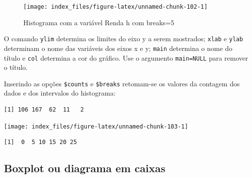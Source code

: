 \documentclass[12pt,brazil,oneside]{book}
\newenvironment{Shaded}{\begin{snugshade}}{\end{snugshade}}
\newcommand{\DataTypeTok}[1]{\textcolor[rgb]{0.13,0.29,0.53}{#1}}
\newcommand{\DecValTok}[1]{\textcolor[rgb]{0.00,0.00,0.81}{#1}}
\newcommand{\KeywordTok}[1]{\textcolor[rgb]{0.13,0.29,0.53}{\textbf{#1}}}
\newcommand{\NormalTok}[1]{#1}
\newcommand{\OperatorTok}[1]{\textcolor[rgb]{0.81,0.36,0.00}{\textbf{#1}}}
\newcommand{\StringTok}[1]{\textcolor[rgb]{0.31,0.60,0.02}{#1}}
\begin{document}
\begin{figure}[H]

{\centering \texttt{[image: index\_files/figure-latex/unnamed-chunk-102-1]} 

}

\caption{Histograma com a variável Renda h com breaks=5}\label{fig:unnamed-chunk-102}
\end{figure}

O comando \texttt{ylim} determina os limites do eixo y a serem mostrados; \texttt{xlab} e \texttt{ylab} determinam o nome das variáveis dos eixos x e y; \texttt{main} determina o nome do título e \texttt{col} determina a cor do gráfico. Use o argumento \texttt{main=NULL} para remover o título.

Inserindo as opções \texttt{\$counts} e \texttt{\$breaks} retomam-se os valores da contagem dos dados e dos intervalos do histograma:

\begin{Shaded}
\end{Shaded}

\begin{verbatim}
[1] 106 167  62  11   2
\end{verbatim}

\begin{Shaded}
\end{Shaded}

\begin{center}\texttt{[image: index\_files/figure-latex/unnamed-chunk-103-1]} \end{center}

\begin{verbatim}
[1]  0  5 10 15 20 25
\end{verbatim}

\hypertarget{boxplot-ou-diagrama-em-caixas}{%
\subsection{Boxplot ou diagrama em caixas}\label{boxplot-ou-diagrama-em-caixas}}
\end{document}
